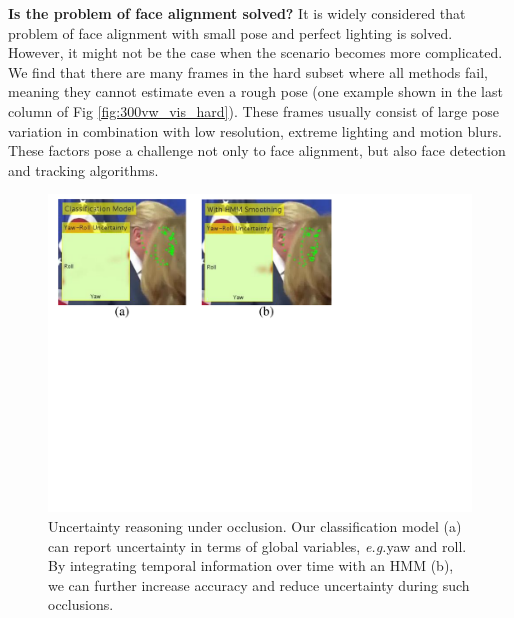 \documentclass[letterpaper]{article} %
\newcommand{\eg}{\textit{e.g.}}
\begin{document}
{\bf Is the problem of face alignment solved?} It is widely considered that problem of face alignment with small pose and perfect lighting is solved. However, it might not be the case when the scenario becomes more complicated. We find that there are many frames in the hard subset where all methods fail, meaning they cannot estimate even a rough pose (one example shown in the last column of Fig \ref{fig:300vw_vis_hard}). These frames usually consist of large pose variation in combination with low resolution, extreme lighting and motion blurs. These factors pose a challenge not only to face alignment, but also face detection and tracking algorithms. %

\begin{figure}[b]
\begin{center}
   \includegraphics[width=1\linewidth]{fig/CompOcclusion.pdf}
\end{center}
   \caption{Uncertainty reasoning under occlusion. Our classification model ({a}) can report uncertainty in terms of global variables, \eg yaw and roll. By integrating temporal information over time with an HMM ({b}), we can further increase accuracy and reduce uncertainty during such occlusions.}%
\label{fig:compocclusion}
\end{figure}
\end{document}

